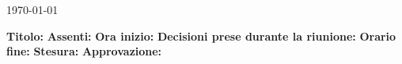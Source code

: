 \documentclass[a4paper]{article}
\begin{document}
	\begin{flushright}
		\today
	\end{flushright}
	\textbf{Titolo:} %
 	\textbf{Assenti:} %
	\textbf{Ora inizio:} %
	\textbf{Decisioni prese durante la riunione:} 
	\vspace{3px}
	\textbf{Orario fine:} %
	\textbf{Stesura:} %
	\textbf{Approvazione:} %
\end{document}
